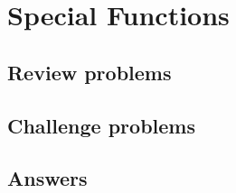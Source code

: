 \section{Special Functions}

\subsection{Review problems}


\subsection{Challenge problems}


\newpage
\subsection{Answers}